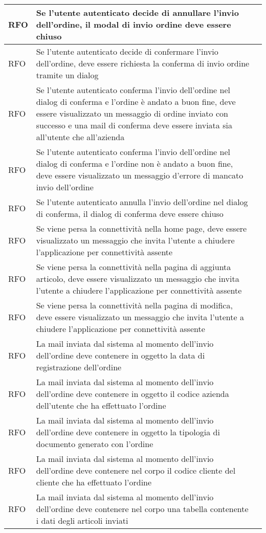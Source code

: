 \begin{center}
\begin{longtable}{ | >{\centering\arraybackslash}m{2.5cm} | >{\centering\arraybackslash}m{8cm} | >{\centering\arraybackslash}m{2.5cm} | }
RFO & Se l'utente autenticato decide di annullare l'invio dell'ordine, il modal di invio ordine deve essere chiuso & \\ \hline
RFO & Se l'utente autenticato decide di confermare l'invio dell'ordine, deve essere richiesta la conferma di invio ordine tramite un dialog & \\ \hline
RFO & Se l'utente autenticato conferma l'invio dell'ordine nel dialog di conferma e l'ordine è andato a buon fine, deve essere visualizzato un messaggio di ordine inviato con successo e una mail di conferma deve essere inviata sia all'utente che all'azienda & \\ \hline
RFO & Se l'utente autenticato conferma l'invio dell'ordine nel dialog di conferma e l'ordine non è andato a buon fine, deve essere visualizzato un messaggio d'errore di mancato invio dell'ordine & \\ \hline
RFO & Se l'utente autenticato annulla l'invio dell'ordine nel dialog di conferma, il dialog di conferma deve essere chiuso & \\ \hline
RFO & Se viene persa la connettività nella home page, deve essere visualizzato un messaggio che invita l'utente a chiudere l'applicazione per connettività assente & \\ \hline
RFO & Se viene persa la connettività nella pagina di aggiunta articolo, deve essere visualizzato un messaggio che invita l'utente a chiudere l'applicazione per connettività assente & \\ \hline
RFO & Se viene persa la connettività nella pagina di modifica, deve essere visualizzato un messaggio che invita l'utente a chiudere l'applicazione per connettività assente & \\ \hline
RFO & La mail inviata dal sistema al momento dell'invio dell'ordine deve contenere in oggetto la data di registrazione dell'ordine & \\ \hline
RFO & La mail inviata dal sistema al momento dell'invio dell'ordine deve contenere in oggetto il codice azienda dell'utente che ha effettuato l'ordine & \\ \hline
RFO & La mail inviata dal sistema al momento dell'invio dell'ordine deve contenere in oggetto la tipologia di documento generato con l'ordine & \\ \hline
RFO & La mail inviata dal sistema al momento dell'invio dell'ordine deve contenere nel corpo il codice cliente del cliente che ha effettuato l'ordine & \\ \hline
RFO & La mail inviata dal sistema al momento dell'invio dell'ordine deve contenere nel corpo una tabella contenente i dati degli articoli inviati & \\ \hline

\end{longtable}
\end{center}
